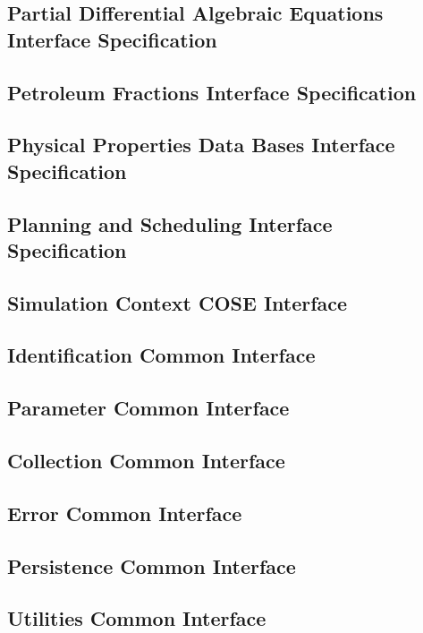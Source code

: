 \subsection{Partial Differential Algebraic Equations Interface Specification}

\subsection{Petroleum Fractions Interface Specification}

\subsection{Physical Properties Data Bases Interface Specification}

\subsection{Planning and Scheduling Interface Specification}

\subsection{Simulation Context COSE Interface}


\subsection{Identification Common Interface}
\subsection{Parameter Common Interface}
\subsection{Collection Common Interface}
\subsection{Error Common Interface}
\subsection{Persistence Common Interface}
\subsection{Utilities Common Interface}


